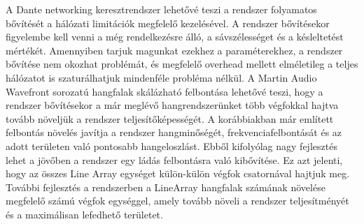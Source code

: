 A Dante networking keresztrendszer lehetővé teszi a rendszer folyamatos bővítését a
hálózati limitációk megfelelő kezelésével. A rendszer bővítésekor figyelembe kell venni a
még rendelkezésre álló, a sávszélességet és a késleltetést mértékét. Amennyiben
tarjuk magunkat ezekhez a paraméterekhez, a rendszer bővítése nem okozhat problémát,
és megfelelő overhead mellett elméletileg a teljes hálózatot is szaturálhatjuk mindenféle probléma nélkül.
A Martin Audio Wavefront sorozatú hangfalak skálázható felbontása lehetővé teszi, hogy
a rendszer bővítésekor a már meglévő hangrendszerünket több végfokkal hajtva tovább
növeljük a rendszer teljesítőképességét. A korábbiakban már említett felbontás növelés
javítja a rendszer hangminőségét, frekvenciafelbontását és az adott területen való
pontosabb hangeloszlást. Ebből kifolyólag nagy fejlesztés lehet a jövőben a rendszer egy ládás
felbontásra való kibővítése. Ez azt jelenti, hogy az összes Line Array egységet külön-külön
végfok csatornával hajtjuk meg.
További fejlesztés a rendszerben a LineArray hangfalak számának növelése megfelelő számú végfok egységgel,
amely tovább növeli a rendszer teljesítményét és a maximálisan lefedhető területet.

